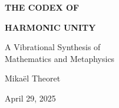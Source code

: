 \documentclass[11pt]{article}
\begin{document}
\pagecolor{black}
\color{white}

\begin{center}
\vfill

{\huge\bfseries\color{golden} THE CODEX OF}

\vspace{1cm}

{\huge\bfseries\color{golden} HARMONIC UNITY}

\vspace{1.5cm}

{\Large A Vibrational Synthesis of\\
Mathematics and Metaphysics}

\vspace{3cm}

{\large Mikaël Theoret}

\vspace{1cm}

{\large April 29, 2025}

\vfill
\end{center}
\end{document}
